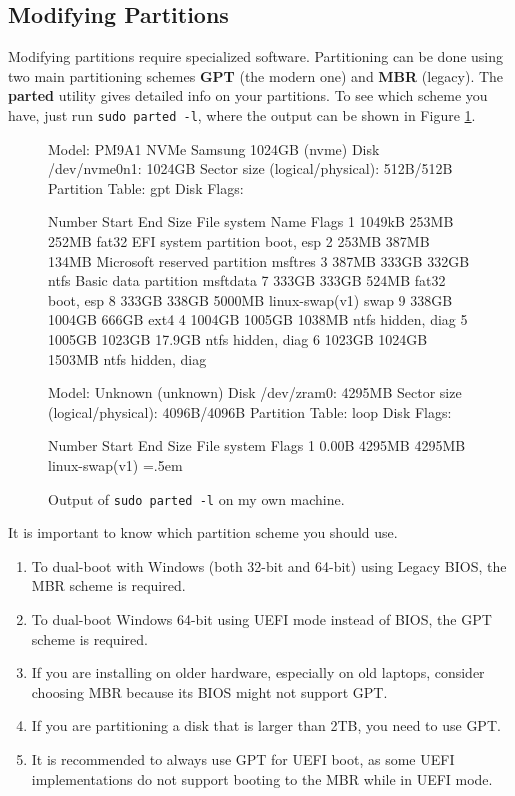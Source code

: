 \documentclass{article}
\theoremstyle{definition}
\newenvironment{cverbatim}
    {\SaveVerbatim{cverb}}
    {\endSaveVerbatim
    \flushleft\fboxrule=0pt\fboxsep=.5em
    \colorbox{cverbbg}{%
      \makebox[\dimexpr\linewidth-2\fboxsep][l]{\BUseVerbatim{cverb}}%
    }
    \endflushleft
  }
\begin{document}
  \subsection{Modifying Partitions} 
    
    Modifying partitions require specialized software. Partitioning can be done using two main partitioning schemes \textbf{GPT} (the modern one) and \textbf{MBR} (legacy). The \textbf{parted} utility gives detailed info on your partitions. To see which scheme you have, just run \texttt{sudo parted -l}, where the output can be shown in Figure \ref{fig:parted}. 

    \begin{figure}[hbt!]
      \centering 
      \begin{cverbatim} 
Model: PM9A1 NVMe Samsung 1024GB (nvme)
Disk /dev/nvme0n1: 1024GB
Sector size (logical/physical): 512B/512B
Partition Table: gpt
Disk Flags: 

Number  Start   End     Size    File system     Name                          Flags
 1      1049kB  253MB   252MB   fat32           EFI system partition          boot, esp
 2      253MB   387MB   134MB                   Microsoft reserved partition  msftres
 3      387MB   333GB   332GB   ntfs            Basic data partition          msftdata
 7      333GB   333GB   524MB   fat32                                         boot, esp
 8      333GB   338GB   5000MB  linux-swap(v1)                                swap
 9      338GB   1004GB  666GB   ext4
 4      1004GB  1005GB  1038MB  ntfs                                          hidden, diag
 5      1005GB  1023GB  17.9GB  ntfs                                          hidden, diag
 6      1023GB  1024GB  1503MB  ntfs                                          hidden, diag


Model: Unknown (unknown)
Disk /dev/zram0: 4295MB
Sector size (logical/physical): 4096B/4096B
Partition Table: loop
Disk Flags: 

Number  Start  End     Size    File system     Flags
 1      0.00B  4295MB  4295MB  linux-swap(v1) 
      \end{cverbatim}
      \caption{Output of \texttt{sudo parted -l} on my own machine. } 
      \label{fig:parted}
    \end{figure}

    It is important to know which partition scheme you should use. 
    \begin{enumerate} 
      \item To dual-boot with Windows (both 32-bit and 64-bit) using Legacy BIOS, the MBR scheme is required.
      \item To dual-boot Windows 64-bit using UEFI mode instead of BIOS, the GPT scheme is required.
      \item If you are installing on older hardware, especially on old laptops, consider choosing MBR because its BIOS might not support GPT.
      \item If you are partitioning a disk that is larger than 2TB, you need to use GPT.
      \item It is recommended to always use GPT for UEFI boot, as some UEFI implementations do not support booting to the MBR while in UEFI mode.
    \end{enumerate}
\end{document}
